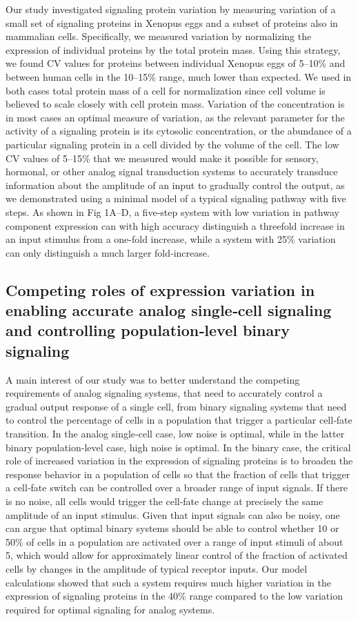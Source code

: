 Our study investigated signaling protein variation by measuring variation of a small set of signaling proteins in Xenopus eggs and a subset of proteins also in mammalian cells. Specifically, we measured variation by normalizing the expression of individual proteins by the total protein mass. Using this strategy, we found CV values for proteins between individual Xenopus eggs of 5–10\% and between human cells in the 10–15\% range, much lower than expected. We used in both cases total protein mass of a cell for normalization since cell volume is believed to scale closely with cell protein mass. Variation of the concentration is in most cases an optimal measure of variation, as the relevant parameter for the activity of a signaling protein is its cytosolic concentration, or the abundance of a particular signaling protein in a cell divided by the volume of the cell. The low CV values of 5–15\% that we measured would make it possible for sensory, hormonal, or other analog signal transduction systems to accurately transduce information about the amplitude of an input to gradually control the output, as we demonstrated using a minimal model of a typical signaling pathway with five steps. As shown in Fig 1A–D, a five‐step system with low variation in pathway component expression can with high accuracy distinguish a threefold increase in an input stimulus from a one-fold increase, while a system with 25\% variation can only distinguish a much larger fold‐increase.

\subsection{Competing roles of expression variation in enabling accurate analog single‐cell signaling and controlling population‐level binary signaling}

A main interest of our study was to better understand the competing requirements of analog signaling systems, that need to accurately control a gradual output response of a single cell, from binary signaling systems that need to control the percentage of cells in a population that trigger a particular cell‐fate transition. In the analog single‐cell case, low noise is optimal, while in the latter binary population‐level case, high noise is optimal. In the binary case, the critical role of increased variation in the expression of signaling proteins is to broaden the response behavior in a population of cells so that the fraction of cells that trigger a cell‐fate switch can be controlled over a broader range of input signals. If there is no noise, all cells would trigger the cell‐fate change at precisely the same amplitude of an input stimulus. Given that input signals can also be noisy, one can argue that optimal binary systems should be able to control whether 10 or 50\% of cells in a population are activated over a range of input stimuli of about 5, which would allow for approximately linear control of the fraction of activated cells by changes in the amplitude of typical receptor inputs. Our model calculations showed that such a system requires much higher variation in the expression of signaling proteins in the 40\% range compared to the low variation required for optimal signaling for analog systems.

